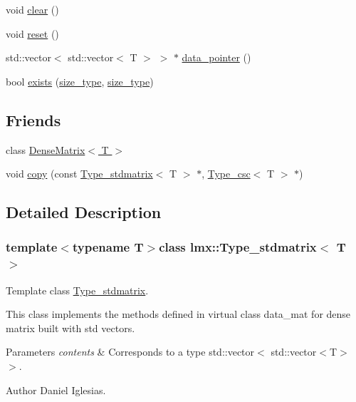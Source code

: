 \begin{DoxyCompactItemize}
\item 
void \hyperlink{classlmx_1_1Type__stdmatrix_a59d589ec3c6c8f9994740ae3b9d0f694}{clear} ()
\item 
void \hyperlink{classlmx_1_1Type__stdmatrix_aaa3747be745b171bd13044d60f169c42}{reset} ()
\item 
std\-::vector$<$ std\-::vector$<$ T $>$ $>$ $\ast$ \hyperlink{classlmx_1_1Type__stdmatrix_aac3ac685acb8ac1b64f5136eb0e575b1}{data\-\_\-pointer} ()
\item 
bool \hyperlink{classlmx_1_1Type__stdmatrix_a737490a62d48b1694bdbd173bbf284d5}{exists} (\hyperlink{lmx__mat__data_8h_a49b489a408a211a90e766329c0732d7b}{size\-\_\-type}, \hyperlink{lmx__mat__data_8h_a49b489a408a211a90e766329c0732d7b}{size\-\_\-type})
\end{DoxyCompactItemize}
\subsection*{Friends}
\begin{DoxyCompactItemize}
\item 
class \hyperlink{classlmx_1_1Type__stdmatrix_a5b3d3d3d338fdb2c08f91dfe38d425bd}{Dense\-Matrix$<$ T $>$}
\item 
void \hyperlink{classlmx_1_1Type__stdmatrix_a333dfe4d7c81c4792d8cc39f5e562d4d}{copy} (const \hyperlink{classlmx_1_1Type__stdmatrix}{Type\-\_\-stdmatrix}$<$ T $>$ $\ast$, \hyperlink{classlmx_1_1Type__csc}{Type\-\_\-csc}$<$ T $>$ $\ast$)
\end{DoxyCompactItemize}


\subsection{Detailed Description}
\subsubsection*{template$<$typename T$>$class lmx\-::\-Type\-\_\-stdmatrix$<$ T $>$}

Template class \hyperlink{classlmx_1_1Type__stdmatrix}{Type\-\_\-stdmatrix}. 

This class implements the methods defined in virtual class data\-\_\-mat for dense matrix built with std vectors.


\begin{DoxyParams}{Parameters}
{\em contents} & Corresponds to a type std\-::vector$<$ std\-::vector$<$\-T$>$ $>$.\\
\hline
\end{DoxyParams}
\begin{DoxyAuthor}{Author}
Daniel Iglesias. 
\end{DoxyAuthor}


